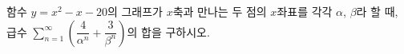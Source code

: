 함수 $y=x^2-x-20$의 그래프가 $x$축과 만나는 두 점의 $x$좌표를 각각 $\alpha$, $\beta$라 할 때, 급수 $\displaystyle\sum_{n=1}^{\infty} \left(\dfrac{4}{\alpha^n}+\dfrac{3}{\beta^n}\right)$의 합을 구하시오. \cond{$\alpha>\beta$}
